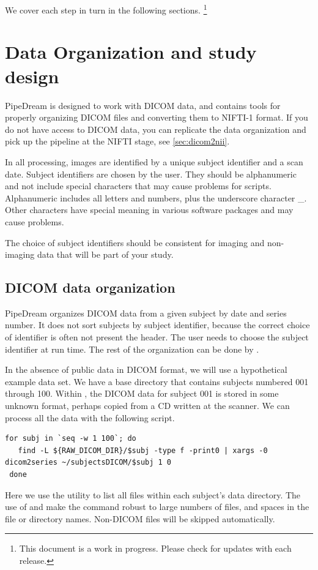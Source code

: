 \documentclass{InsightArticle}
\begin{document}
We cover each step in turn in the following sections. \footnote{This document is a work in progress. Please check for updates with each release.}


\section{Data Organization and study design}

PipeDream is designed to work with DICOM data, and contains tools for properly organizing DICOM files and converting them to NIFTI-1 format. If you do not have access to DICOM data, you can replicate the data organization and pick up the pipeline at the NIFTI stage, see \ref{sec:dicom2nii}.

In all processing, images are identified by a unique subject identifier and a scan date. Subject identifiers are chosen by the user. They should be alphanumeric and not include special characters that may cause problems for scripts. Alphanumeric includes all letters and numbers, plus the underscore character \_. Other characters have special meaning in various software packages and may cause problems. 

The choice of subject identifiers should be consistent for imaging and non-imaging data that will be part of your study. 


\subsection{DICOM data organization}

PipeDream organizes DICOM data from a given subject by date and series number. It does not sort subjects by subject identifier, because the correct choice of identifier is often not present the header. The user needs to choose the subject identifier at run time. The rest of the organization can be done by .

In the absence of public data in DICOM format, we will use a hypothetical example data set. We have a base directory  that contains subjects numbered 001 through 100. Within , the DICOM data for subject 001 is stored in some unknown format, perhaps copied from a CD written at the scanner. We can process all the data with the following script.
\begin{lstlisting}[style=bash]
 for subj in `seq -w 1 100`; do
   find -L ${RAW_DICOM_DIR}/$subj -type f -print0 | xargs -0 dicom2series ~/subjectsDICOM/$subj 1 0 
 done
\end{lstlisting}
Here we use the  utility to list all files within each subject's data directory. The use of  and  make the command robust to large numbers of files, and spaces in the file or directory names. Non-DICOM files will be skipped automatically. 
\end{document}
